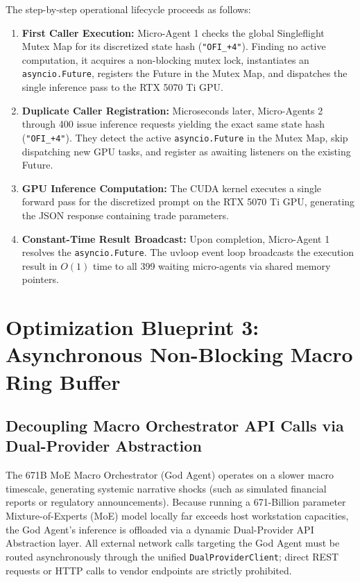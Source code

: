 The step-by-step operational lifecycle proceeds as follows:
\begin{enumerate}
    \item \textbf{First Caller Execution:} Micro-Agent 1 checks the global Singleflight Mutex Map for its discretized state hash (\texttt{"OFI\_+4"}). Finding no active computation, it acquires a non-blocking mutex lock, instantiates an \texttt{asyncio.Future}, registers the Future in the Mutex Map, and dispatches the single inference pass to the RTX 5070 Ti GPU.
    \item \textbf{Duplicate Caller Registration:} Microseconds later, Micro-Agents 2 through 400 issue inference requests yielding the exact same state hash (\texttt{"OFI\_+4"}). They detect the active \texttt{asyncio.Future} in the Mutex Map, skip dispatching new GPU tasks, and register as awaiting listeners on the existing Future.
    \item \textbf{GPU Inference Computation:} The CUDA kernel executes a single forward pass for the discretized prompt on the RTX 5070 Ti GPU, generating the JSON response containing trade parameters.
    \item \textbf{Constant-Time Result Broadcast:} Upon completion, Micro-Agent 1 resolves the \texttt{asyncio.Future}. The uvloop event loop broadcasts the execution result in $O(1)$ time to all 399 waiting micro-agents via shared memory pointers.
\end{enumerate}

\section{Optimization Blueprint 3: Asynchronous Non-Blocking Macro Ring Buffer}

\subsection{Decoupling Macro Orchestrator API Calls via Dual-Provider Abstraction}

The 671B MoE Macro Orchestrator (God Agent) operates on a slower macro timescale, generating systemic narrative shocks (such as simulated financial reports or regulatory announcements). Because running a 671-Billion parameter Mixture-of-Experts (MoE) model locally far exceeds host workstation capacities, the God Agent's inference is offloaded via a dynamic Dual-Provider API Abstraction layer. All external network calls targeting the God Agent must be routed asynchronously through the unified \texttt{DualProviderClient}; direct REST requests or HTTP calls to vendor endpoints are strictly prohibited.

